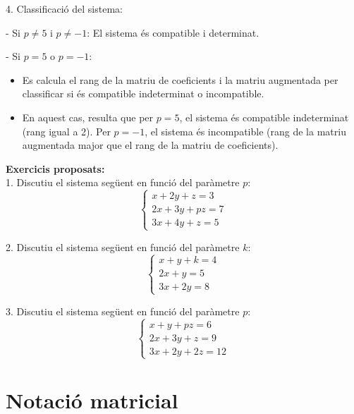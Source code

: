 \documentclass[12pt]{article}
\begin{document}
\begin{exemple}
4. Classificació del sistema:

   - Si \( p \neq 5 \) i \( p \neq -1 \): El sistema és compatible i determinat.

   - Si \( p = 5 \) o \( p = -1 \): 
     \begin{itemize}
         \item Es calcula el rang de la matriu de coeficients i la matriu augmentada per classificar si és compatible indeterminat o incompatible.
         \item En aquest cas, resulta que per \( p = 5 \), el sistema és compatible indeterminat (rang igual a 2). Per \( p = -1 \), el sistema és incompatible (rang de la matriu augmentada major que el rang de la matriu de coeficients).
     \end{itemize}

\end{exemple}


\begin{exercici}
\textbf{Exercicis proposats:}\\
1. Discutiu el sistema següent en funció del paràmetre \( p \):
\[
\begin{cases}
x + 2y + z = 3 \\
2x + 3y + pz = 7 \\
3x + 4y + z = 5
\end{cases}
\]
\end{exercici}

\begin{exercici}
2. Discutiu el sistema següent en funció del paràmetre \( k \):
\[
\begin{cases}
x + y + k = 4 \\
2x + y = 5 \\
3x + 2y = 8
\end{cases}
\]
\end{exercici}

\begin{exercici}
3. Discutiu el sistema següent en funció del paràmetre \( p \):
\[
\begin{cases}
x + y + pz = 6 \\
2x + 3y + z = 9 \\
3x + 2y + 2z = 12
\end{cases}
\]
\end{exercici}


\newpage

\section{Notació matricial}
\end{document}
